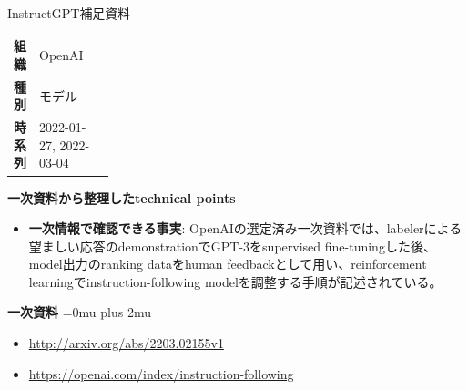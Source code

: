 \begin{technicalnote}{InstructGPT}{補足資料}
\begingroup
\begin{tabularx}{\linewidth}{@{}>{\bfseries}p{0.22\linewidth}X@{}}
組織 & OpenAI \\
種別 & モデル \\
時系列 & 2022-01-27, 2022-03-04 \\
\end{tabularx}
\smallskip
{\bfseries 一次資料から整理したtechnical points}
\begin{itemize}[leftmargin=1.5em,itemsep=0.35em]
\item \textbf{一次情報で確認できる事実}: OpenAIの選定済み一次資料では、labelerによる望ましい応答のdemonstrationでGPT-3をsupervised fine-tuningした後、model出力のranking dataをhuman feedbackとして用い、reinforcement learningでinstruction-following modelを調整する手順が記述されている。
\end{itemize}
\begin{minipage}{\linewidth}
\begin{samepage}
{\bfseries 一次資料}
\begingroup\sloppy
\Urlmuskip=0mu plus 2mu\relax
\begin{itemize}[leftmargin=1.5em,itemsep=0.25em]
\item {\scriptsize\url{http://arxiv.org/abs/2203.02155v1}}
\item {\scriptsize\url{https://openai.com/index/instruction-following}}
\end{itemize}
\endgroup
\end{samepage}
\end{minipage}
\endgroup
\end{technicalnote}
\medskip

